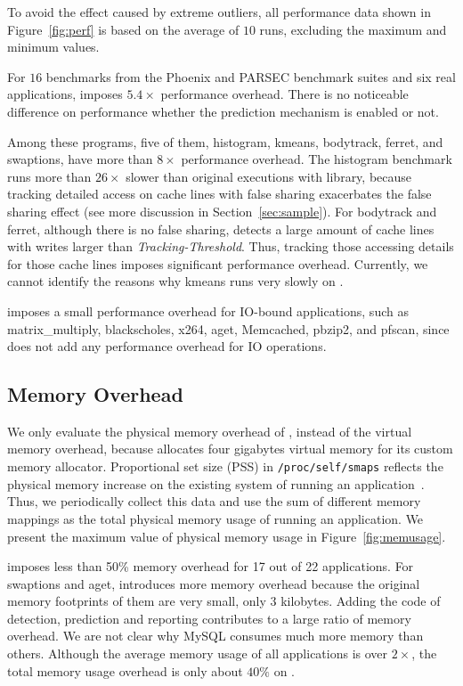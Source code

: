 To avoid the effect caused by extreme outliers, all performance data shown in Figure~\ref{fig:perf} is based on the average of $10$ runs, excluding the maximum and minimum values. 

For $16$ benchmarks from the Phoenix and PARSEC benchmark suites and six real applications, \Predator{} imposes $5.4\times$ performance overhead. There is no noticeable difference on performance whether the prediction mechanism is enabled or not. 
 
Among these programs, five of them, histogram, kmeans, bodytrack, ferret, and swaptions, have more than $8\times$ performance overhead. The histogram benchmark runs more than $26\times$ slower than original executions with \pthreads{} library, because tracking detailed access on cache lines with false sharing exacerbates the false sharing effect (see more discussion in Section~\ref{sec:sample}).  For bodytrack and ferret, although there is no false sharing, \Predator{} detects a large amount of cache lines with writes larger than {\it Tracking-Threshold}. Thus, tracking those accessing details for those cache lines imposes significant performance overhead. Currently, we cannot identify the reasons why kmeans runs very slowly on \Predator{}.
   
\Predator{} imposes a small performance overhead for IO-bound applications, such as matrix\_multiply, blackscholes, x264, aget, Memcached, pbzip2, and pfscan, since \Predator{} does not add any performance overhead for IO operations.  

\subsection{Memory Overhead}
\label{sec:memoverhead}
We only evaluate the physical memory overhead of \Predator{}, instead of the virtual memory overhead, because \Predator{} allocates four gigabytes virtual memory for its custom memory allocator. Proportional set size (PSS) in \texttt{/proc/self/smaps} reflects the physical memory increase on the existing system of running an application~\cite{memusage}. Thus, we periodically collect this data and use the sum of different memory mappings as the total physical memory usage of running an application. We present the maximum value of physical memory usage in Figure~\ref{fig:memusage}. 

\Predator{} imposes less than 50\% memory overhead for 17 out of 22 applications.  For swaptions and aget, \Predator{} introduces more memory overhead because the original memory footprints of them are very small, only $3$ kilobytes. Adding the code of detection, prediction and reporting contributes to a large ratio of memory overhead. We are not clear why MySQL consumes much more memory than others. Although the average memory usage of all applications is over $2\times$, the total memory usage overhead is only about $40\%$ on \Predator{}. 


